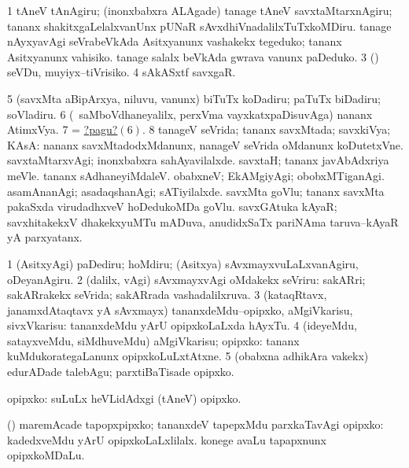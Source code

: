 \noindent
\gl{\pagu}
\bmng
\bnum
\num{1}  tAneV tAnAgiru; (inonxbabxra ALAgade) tanage tAneV savxtaMtarxnAgiru; tananx shakitxgaLelalxvanUnx pUNaR sAvxdhiVnadalilxTuTxkoMDiru. 
  
\banum
{} tanage nAyxyavAgi seVrabeVkAda Asitxyanunx vashakekx tegeduko; tananx Asitxyanunx vahisiko. 
 tanage salalx beVkAda gwrava \mo vanunx paDeduko. 
\eanum
\numie
\num{3}  (\AmA) seVDu, muyiyx--tiVrisiko. 
\num{4} sAkASxtf savxgaR. 
\num{5}  (savxMta aBipArxya, niluvu, \mo vanunx) biTuTx koDadiru; paTuTx biDadiru; soVladiru. 
\hypertarget{ownpagu6}{} 
\num{6}  (\kanmu\ saMboVdhaneyalilx, perxVma vayxkatxpaDisuvAga) nananx AtimxVya. 
\num{7}  = \hyperlink{ownpagu6}{?pagu?\((6)\)}. 
\num{8}  tanageV seVrida; tananx savxMtada; savxkiVya; KAsA:  nananx savxMtadodxMdanunx, nanageV seVrida oMdanunx koDutetxVne. 
  
\banum
{} savxtaMtarxvAgi; inonxbabxra sahAyavilalxde. 
 savxtaH; tananx javAbAdxriya meVle. 
 tananx sAdhaneyiMdaleV. 
 obabxneV; EkAMgiyAgi; obobxMTiganAgi. 
 asamAnanAgi; asadaqshanAgi; sATiyilalxde. 
\eanum
\numie
{}  
\banum
{} savxMta goVlu; tananx savxMta pakaSxda virudadhxveV hoDedukoMDa goVlu. 
 savxGAtuka kAyaR; savxhitakekxV dhakekxyuMTu mADuva, anudidxSaTx pariNAma taruva--kAyaR yA parxyatanx. 
\eanum
\numie
\enum
\emng
\eentry

\bentry
{}
\gl{\sakirx}
\bmng
\bnum
\num{1} (AsitxyAgi) paDediru; hoMdiru; (Asitxya) sAvxmayxvuLaLxvanAgiru, oDeyanAgiru. 
\num{2} (\BUkaq dalilx, \sapUpa vAgi) sAvxmayxvAgi oMdakekx seVriru:  sakARri; sakARrakekx seVrida; sakARrada vashadalilxruva. 
\num{3} (kataqRtavx, janamxdAtaqtavx yA sAvxmayx) tananxdeMdu--opipxko, aMgiVkarisu, sivxVkarisu:  tananxdeMdu yArU opipxkoLaLxda hAyxTu. 
\num{4} (ideyeMdu, satayxveMdu, siMdhuveMdu) aMgiVkarisu; opipxko:  tananx kuMdukorategaLanunx opipxkoLuLxtAtxne. 
\num{5} (obabxna adhikAra \mo vakekx) edurADade talebAgu; parxtiBaTisade opipxko. 
\enum
\emng

\noindent
\gl{\akirx}
\bmng
opipxko:  suLuLx heVLidAdxgi (tAneV) opipxko. 
\emng

\noindent
\gl{\pagu}
\bmng
{} (\AmA) maremAcade tapopxpipxko; tananxdeV tapepxMdu parxkaTavAgi opipxko:  kadedxveMdu yArU opipxkoLaLxlilalx.  konege avaLu tapapxnunx opipxkoMDaLu. 
\emng
\eentry

